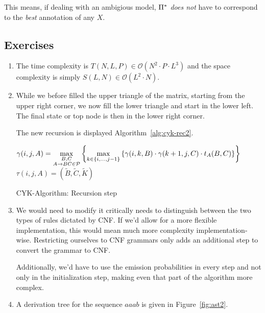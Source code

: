 This means, if dealing with an ambigious model, \(\Pi^*\) \emph{does not}
have to correspond to the \emph{best} annotation of any \(X\).

\subsection*{Exercises}
\begin{enumerate}[label=(\alph*)]
\item The time complexity is \(T(N,L,P)\in\mathcal{O}(N^2\cdot P\cdot L^3)\)
  and the space complexity is simply \(S(L,N) \in \mathcal{O}(L^2\cdot N)\).
\item While we before filled the upper triangle of the matrix, starting from
  the upper right corner, we now fill the lower triangle and start in the
  lower left.  The final state or top node is then in the lower right corner.

  The new recursion is displayed Algorithm~\ref{alg:cyk-rec2}.

\AlgoDisplayBlockMarkers\SetAlgoNoLine%
\begin{algorithm}[ht]
 {
     {
         {
            $\gamma(i,j,A) = \max\limits_{\substack{B,C\\A\to BC\in\mathcal{P}}}
                \left\{ \max\limits_{k\in\{i,\dotsc,j-1\}}
                \left\{ \gamma(i,k,B) \cdot \gamma(k+1,j,C) \cdot t_A(B,C) \right\} \right\} $\;
            $\tau(i,j,A) = (\widetilde{B},\widetilde{C},\widetilde{K})$
        }
    }
}
\label{alg:cyk-rec2}
\caption{CYK-Algorithm: Recursion step}
\end{algorithm}

\item We would need to modify it critically needs to distinguish between
  the two types of rules dictated by CNF\@.  If we'd allow for a more flexible
  implementation, this would mean much more complexity implementation-wise.
  Restricting ourselves to CNF grammars only adds an additional step to convert
  the grammar to CNF\@.

  Additionally, we'd have to use the emission probabilities in every step and
  not only in the initialization step, making even that part of the algorithm
  more complex.
\item A derivation tree for the sequence \(aaab\) is given in
  Figure~\ref{fig:ast2}.


\end{enumerate}

